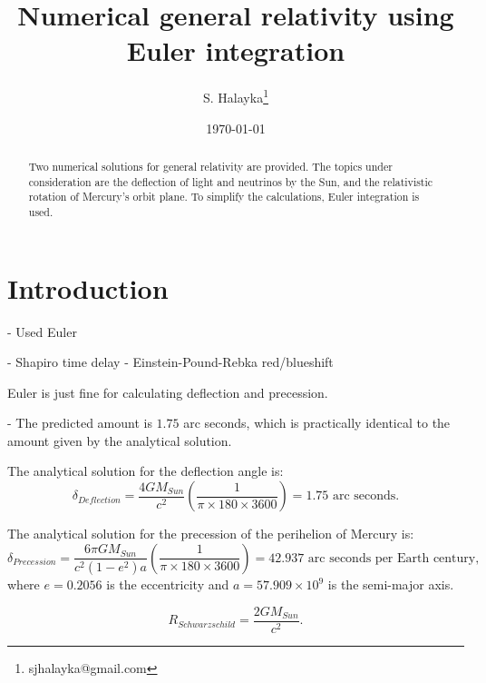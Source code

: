 \documentclass[12pt]{article}
\title{Numerical general relativity using Euler integration}
\author{S. Halayka\footnote{sjhalayka@gmail.com}}
\date{\today\;\currenttime}
\begin{document}
 
\maketitle

\begin{abstract}
Two numerical solutions for general relativity are provided.
The topics under consideration are the deflection of light and neutrinos by the Sun, and the relativistic rotation of Mercury's orbit plane.
To simplify the calculations, Euler integration is used.
\end{abstract}





\section{Introduction}

- Used Euler

- Shapiro time delay
- Einstein-Pound-Rebka red/blueshift







Euler is just fine for calculating deflection and precession.




- The predicted amount is $1.75$ arc seconds, which is practically identical to the amount given by the analytical solution.




The analytical solution for the deflection angle is:
\begin{equation}
\delta_{Deflection} = \frac{4GM_{Sun}}{c^2} \left( \frac{1}{\pi \times 180 \times 3600} \right) = 1.75 \textrm{ arc seconds}.
\end{equation}

The analytical solution for the precession of the perihelion of Mercury is:
\begin{equation}
\delta_{Precession} = \frac{6 \pi GM_{Sun}}{c^2 (1 - e^2) a} \left( \frac{1}{ \pi \times 180 \times 3600} \right) = 42.937 \textrm{ arc seconds per Earth century},
\end{equation}
where $e = 0.2056$ is the eccentricity and $a = 57.909 \times 10^9$ is the semi-major axis.



\begin{equation}
R_{Schwarzschild} = \frac{2GM_{Sun}}{c^2}.
\end{equation}
\end{document}
